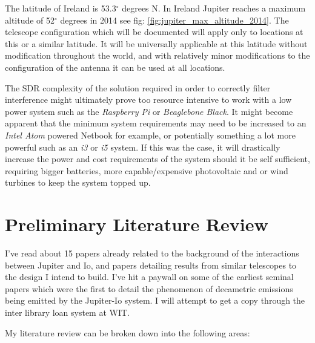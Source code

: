 \documentclass[runningheads,a4paper]{llncs}
\begin{document}
The latitude of Ireland is 53.3$^{\circ}$ degrees N. In Ireland Jupiter reaches a maximum altitude of 52$^{\circ}$ degrees in 2014 see fig: \ref{fig:jupiter_max_altitude_2014}. The telescope configuration which will be documented will apply only to locations at this or a similar latitude. It will be universally applicable at this latitude without modification throughout the world, and with relatively minor modifications to the configuration of the antenna it can be used at all locations. \cite{nasa12}

The \gls{SDR} complexity of the solution required in order to correctly filter interference might ultimately prove too resource intensive to work with a low power system such as the \textit{Raspberry Pi} or \textit{Beaglebone Black}. It might become apparent that the minimum system requirements may need to be increased to an \textit{Intel Atom} powered Netbook for example, or potentially something a lot more powerful such as an \textit{i3} or \textit{i5} system. If this was the case, it will drastically increase the power and cost requirements of the system should it be self sufficient, requiring bigger batteries, more capable/expensive photovoltaic and or wind turbines to keep the system topped up.

%
%
\newpage
\section*{Preliminary Literature Review}


I've read about 15 papers already related to the background of the interactions between Jupiter and Io, and papers detailing results from similar telescopes to the design I intend to build. I've hit a paywall on some of the earliest seminal papers which were the first to detail the phenomenon of decametric emissions being emitted by the Jupiter-Io system. I will attempt to get a copy through the inter library loan system at WIT.


My literature review can be broken down into the following areas:
\end{document}
